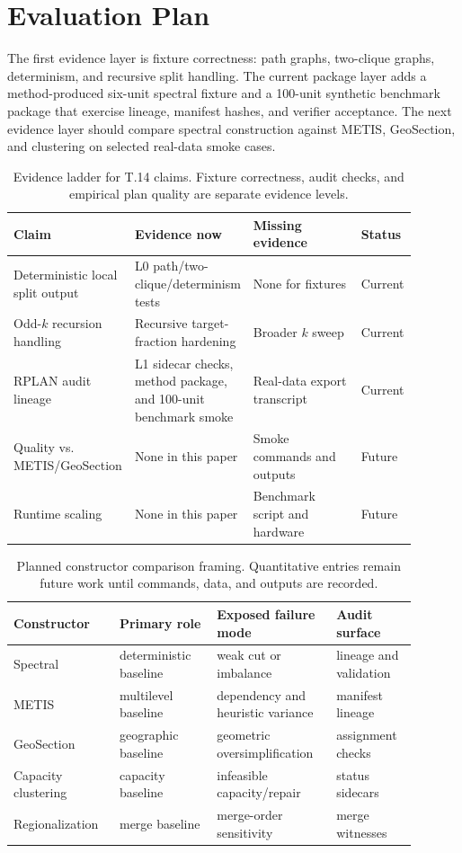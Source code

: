 \section{Evaluation Plan}

The first evidence layer is fixture correctness: path graphs, two-clique graphs,
determinism, and recursive split handling. The current package layer adds a
method-produced six-unit spectral fixture and a 100-unit synthetic benchmark
package that exercise lineage, manifest hashes, and verifier acceptance. The
next evidence layer should compare spectral construction against METIS,
GeoSection, and clustering on selected real-data smoke cases.

\begin{table}[h]
\centering
\small
\begin{tabular}{p{0.22\linewidth}p{0.28\linewidth}p{0.27\linewidth}p{0.12\linewidth}}
\toprule
Claim & Evidence now & Missing evidence & Status \\
\midrule
Deterministic local split output & L0 path/two-clique/determinism tests & None for fixtures & Current \\
Odd-\(k\) recursion handling & Recursive target-fraction hardening & Broader \(k\) sweep & Current \\
RPLAN audit lineage & L1 sidecar checks, method package, and 100-unit benchmark smoke & Real-data export transcript & Current \\
Quality vs. METIS/GeoSection & None in this paper & Smoke commands and outputs & Future \\
Runtime scaling & None in this paper & Benchmark script and hardware & Future \\
\bottomrule
\end{tabular}
\caption{Evidence ladder for T.14 claims. Fixture correctness, audit checks,
and empirical plan quality are separate evidence levels.}
\end{table}

\begin{table}[h]
\centering
\small
\begin{tabular}{p{0.22\linewidth}p{0.22\linewidth}p{0.27\linewidth}p{0.18\linewidth}}
\toprule
Constructor & Primary role & Exposed failure mode & Audit surface \\
\midrule
Spectral & deterministic baseline & weak cut or imbalance & lineage and validation \\
METIS & multilevel baseline & dependency and heuristic variance & manifest lineage \\
GeoSection & geographic baseline & geometric oversimplification & assignment checks \\
Capacity clustering & capacity baseline & infeasible capacity/repair & status sidecars \\
Regionalization & merge baseline & merge-order sensitivity & merge witnesses \\
\bottomrule
\end{tabular}
\caption{Planned constructor comparison framing. Quantitative entries remain
future work until commands, data, and outputs are recorded.}
\end{table}

